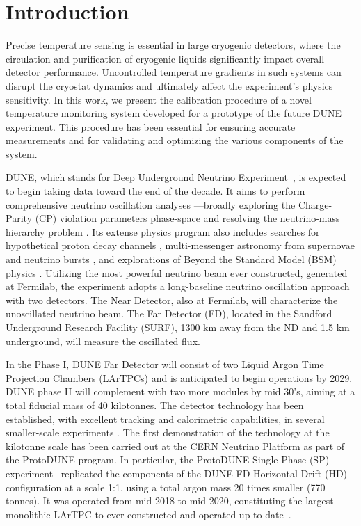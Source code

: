 \section{Introduction}
\label{sec:introduction}

\noindent Precise temperature sensing is essential in large cryogenic detectors, where the circulation and purification of cryogenic liquids significantly impact overall detector performance. Uncontrolled temperature gradients in such systems can disrupt the cryostat dynamics and ultimately affect the experiment's physics sensitivity. In this work, we present the calibration procedure of a novel temperature monitoring system developed for a prototype of the future DUNE experiment. This procedure has been essential for ensuring accurate measurements and for validating and optimizing the various components of the system.

DUNE, which stands for Deep Underground Neutrino Experiment~\cite{dune_tdr1}, is expected to begin taking data toward the end of the decade. It aims to perform comprehensive neutrino oscillation analyses ---broadly exploring the Charge-Parity (CP) violation parameters phase-space and resolving the neutrino-mass hierarchy problem \cite{bib:dune_osc}. Its extense physics program also includes searches for hypothetical proton decay channels \cite{bib:dune_tdr2}, multi-messenger astronomy from supernovae and neutrino bursts \cite{bib:dune_supernova}, and explorations of Beyond the Standard Model (BSM) physics \cite{bib:dune_bsm}. Utilizing the most powerful neutrino beam ever constructed, generated at Fermilab, the experiment adopts a long-baseline neutrino oscillation approach with two detectors. The Near Detector, also at Fermilab, will characterize the unoscillated neutrino beam. The Far Detector (FD), located in the Sandford Underground Research Facility (SURF), 1300 km away from the ND and 1.5 km underground, will measure the oscillated flux.

In the Phase I, DUNE Far Detector will consist of two Liquid Argon Time Projection Chambers (LArTPCs) and is anticipated to begin operations by 2029. DUNE phase II will complement with two more modules by mid 30's, aiming at a total fiducial mass of 40 kilotonnes. The detector technology has been established, with excellent tracking and calorimetric capabilities, in several smaller-scale experiments \cite{icarus,microboone}. The first demonstration of the technology at the kilotonne scale has been carried out at the CERN Neutrino Platform as part of the ProtoDUNE program. In particular, the ProtoDUNE Single-Phase (SP) experiment~\cite{pdsp_tdr} replicated the components of the DUNE FD Horizontal Drift (HD)~\cite{dune_tdr4} configuration at a scale 1:1, using a total argon mass 20 times smaller (770 tonnes). It was operated from mid-2018 to mid-2020, constituting the largest monolithic LArTPC to ever constructed and operated up to date~\cite{pdsp_1,pdsp_2}.

